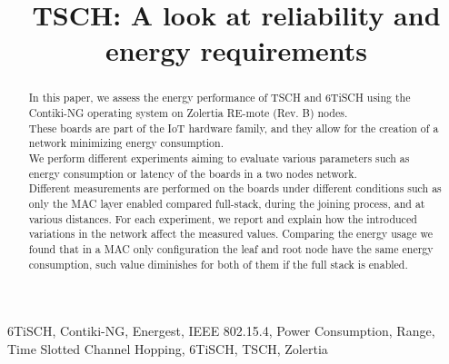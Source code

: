 \documentclass[conference]{IEEEtran}
\renewcommand\_{\textunderscore\allowbreak}
\begin{document}
\title{TSCH: A look at reliability and energy requirements}

\author{
\and
{}
}

\maketitle

\begin{abstract}
In this paper, we assess the energy performance of TSCH and 6TiSCH using the Contiki-NG operating system on Zolertia RE-mote (Rev. B) nodes.\\
These boards are part of the IoT hardware family, and they allow for the creation of a network minimizing energy consumption.\\
We perform different experiments aiming to evaluate various parameters such as energy consumption or latency of the boards in a two nodes network.\\
Different measurements are performed on the boards under different conditions such as only the MAC layer enabled compared full-stack, during the joining process, and at various distances.
For each experiment, we report and explain how the introduced variations in the network affect the measured values.
Comparing the energy usage we found that in a MAC only configuration the leaf and root node have the same energy consumption, such value diminishes for both of them if the full stack is enabled.
\end{abstract}

\begin{IEEEkeywords}
6TiSCH, Contiki-NG, Energest, IEEE 802.15.4, Power Consumption, Range, Time Slotted Channel Hopping, 6TiSCH, TSCH, Zolertia
\end{IEEEkeywords}
\end{document}
